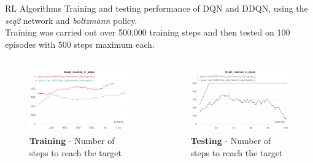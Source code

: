 \documentclass[10pt, xcolor={dvipsnames}]{beamer}
\begin{document}
{
\begin{frame}{RL Algorithms}
    Training and testing performance of \alert{DQN} and \alert{DDQN}, using the \textit{seq2} network and \textit{boltzmann} policy. \\
    Training was carried out over 500,000 training steps and then tested on 100 episodes with 500 steps maximum each.
    
    \begin{columns}
    \begin{figure}
        \centering
        \includegraphics[width=1\textwidth, height=0.75\textwidth]{assets/results/rl/target_reached_in_steps.png}
        \caption*{\textbf{Training} - Number of steps to reach the target}
    \end{figure}
    \begin{figure}
        \centering
        \includegraphics[width=1\textwidth, height=0.75\textwidth]{assets/results/rl/target_reached_in_steps_t.png}
        \caption*{\textbf{Testing} - Number of steps to reach the target}
    \end{figure}
    \end{columns}
\end{frame}
}
\end{document}
